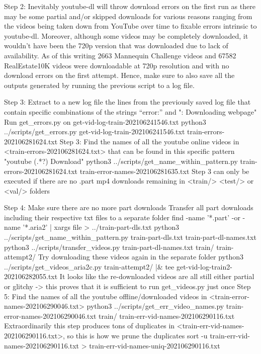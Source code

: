 Step 2: Inevitably youtube-dl will throw download errors on the first run as there may be some partial and/or skipped downloads for various reasons ranging from the videos being taken down from YouTube over time to fixable errors intrinsic to youtube-dl. Moreover, although some videos may be completely downloaded, it wouldn’t have been the 720p version that was downloaded due to lack of availability. As of this writing 2663 Mannequin Challenge videos and 67582 RealEstate10K videos were downloadable at 720p resolution and with no download errors on the first attempt. Hence, make sure to also save all the outputs generated by running the previous script to a log file.

Step 3: Extract to a new log file the lines from the previously saved log file that contain specific combinations of the strings “error:” and ": Downloading webpage" Run get_errors.py on get-vid-log-train-202106241546.txt
python3 ../scripts/get_errors.py get-vid-log-train-202106241546.txt train-errors-202106281624.txt
Step 3: Find the names of all the youtube online videos in <train-errors-202106281624.txt> that can be found in this specific pattern
"youtube\] (.*?)\: Download"
python3 ../scripts/get_name_within_pattern.py train-errors-202106281624.txt train-error-names-202106281635.txt
Step 3 can only be executed if there are no .part mp4 downloads remaining in <train/> <test/> or <val/> folders
 
Step 4: Make sure there are no more part downloads
Transfer all part downloads including their respective txt files to a separate folder
find -name '*.part' -or -name '*.aria2' | xargs file > ../train-part-dls.txt
python3 ../scripts/get_name_within_pattern.py train-part-dls.txt train-part-dl-names.txt
python3 ../scripts/transfer_videos.py train-part-dl-names.txt train/ train-attempt2/
Try downloading these videos again in the separate folder
python3 ../scripts/get_videos_aria2c.py train-attempt2/ |& tee get-vid-log-train2-202106282055.txt
It looks like the re-downloaded videos are all still either partial or glitchy -> this proves that it is sufficient to run get_videos.py just once
Step 5: Find the names of all the youtube offline/downloaded videos in <train-error-names-202106290046.txt>
python3 ../scripts/get_err_video_names.py train-error-names-202106290046.txt train/ train-err-vid-names-202106290116.txt
Extraordinarily this step produces tons of duplicates in <train-err-vid-names-202106290116.txt>, so this is how we prune the duplicates
 sort -u train-err-vid-names-202106290116.txt > train-err-vid-names-uniq-202106290116.txt


